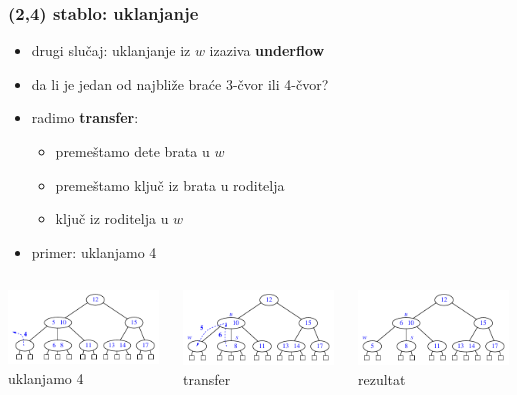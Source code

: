 \documentclass[compress]{beamer}
\begin{document}
\begin{frame}[fragile]
  \frametitle{(2,4) stablo: uklanjanje}
  \begin{itemize}
    \item drugi slučaj: uklanjanje iz $w$ izaziva \textbf{underflow}
    \item da li je jedan od najbliže braće 3-čvor ili 4-čvor?
    \item radimo \textbf{transfer}:
    \begin{itemize}
      \item premeštamo dete brata u $w$
      \item premeštamo ključ iz brata u roditelja
      \item ključ iz roditelja u $w$
    \end{itemize}
    \item primer: uklanjamo 4
  \end{itemize}
  \begin{columns}
    \begin{column}[c]{4cm}
      \begin{center}
        \includegraphics[width=4cm]{asp-11-pic35a.pdf}
      \\ uklanjamo 4
      \end{center}
    \end{column}
    \begin{column}[c]{4cm}
      \begin{center}
        \includegraphics[width=4cm]{asp-11-pic35b.pdf}
      \\ transfer
      \end{center}
    \end{column}
    \begin{column}[c]{4cm}
      \begin{center}
        \includegraphics[width=4cm]{asp-11-pic35c.pdf}
      \\ rezultat
      \end{center}
    \end{column}
  \end{columns}
\end{frame}
\end{document}
